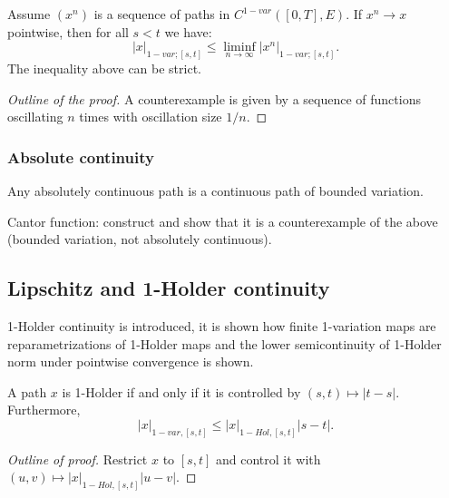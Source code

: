 \begin{lemma}
    Assume $(x^n)$ is a sequence of paths in $C^{1-var}([0,T],E)$. If $x^n \rightarrow x$ pointwise, then for all $s < t$ we have:
    \begin{equation}
        |x|_{1-var; [s,t]} \leq \liminf_{n \rightarrow \infty} |x^n|_{1-var; [s,t]}.
    \end{equation}
    The inequality above can be strict.
\end{lemma}
\begin{proof}[Outline of the proof]
    A counterexample is given by a sequence of functions oscillating $n$ times with oscillation size $1/n$.
\end{proof}
\subsubsection{Absolute continuity}

\begin{proposition}
    Any absolutely continuous path is a continuous path of bounded variation.
\end{proposition}

\begin{example}
    Cantor function: construct and show that it is a counterexample of the above (bounded variation, not absolutely continuous).
\end{example}

\subsection{Lipschitz and 1-Holder continuity}

1-Holder continuity is introduced, it is shown how finite 1-variation maps are reparametrizations of 1-Holder maps and the lower semicontinuity of 1-Holder norm under pointwise convergence is shown.

\begin{lemma}\label{lem:HolderControl}
    A path $x$ is 1-Holder if and only if it is controlled by $(s,t) \mapsto |t-s|.$
    Furthermore, 
    \begin{equation}
    |x|_{1-var,[s,t]} \leq |x|_{1-Hol,[s,t]}|s-t|.
    \end{equation}
\end{lemma}
\begin{proof}[Outline of proof]
Restrict $x$ to $[s,t]$ and control it with $(u,v) \mapsto |x|_{1-Hol,[s,t]}|u-v|.$
\end{proof}

